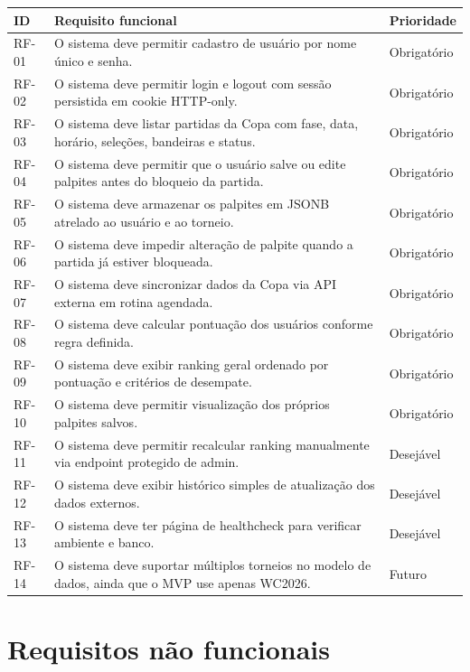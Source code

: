 \documentclass[12pt,a4paper]{article}
\begin{document}
\begin{longtable}{p{}p{}p{}}
\toprule
\textbf{ID} & \textbf{Requisito funcional} & \textbf{Prioridade} \\
\midrule
RF-01 & O sistema deve permitir cadastro de usuário por nome único e senha. & Obrigatório \\
RF-02 & O sistema deve permitir login e logout com sessão persistida em cookie HTTP-only. & Obrigatório \\
RF-03 & O sistema deve listar partidas da Copa com fase, data, horário, seleções, bandeiras e status. & Obrigatório \\
RF-04 & O sistema deve permitir que o usuário salve ou edite palpites antes do bloqueio da partida. & Obrigatório \\
RF-05 & O sistema deve armazenar os palpites em JSONB atrelado ao usuário e ao torneio. & Obrigatório \\
RF-06 & O sistema deve impedir alteração de palpite quando a partida já estiver bloqueada. & Obrigatório \\
RF-07 & O sistema deve sincronizar dados da Copa via API externa em rotina agendada. & Obrigatório \\
RF-08 & O sistema deve calcular pontuação dos usuários conforme regra definida. & Obrigatório \\
RF-09 & O sistema deve exibir ranking geral ordenado por pontuação e critérios de desempate. & Obrigatório \\
RF-10 & O sistema deve permitir visualização dos próprios palpites salvos. & Obrigatório \\
RF-11 & O sistema deve permitir recalcular ranking manualmente via endpoint protegido de admin. & Desejável \\
RF-12 & O sistema deve exibir histórico simples de atualização dos dados externos. & Desejável \\
RF-13 & O sistema deve ter página de healthcheck para verificar ambiente e banco. & Desejável \\
RF-14 & O sistema deve suportar múltiplos torneios no modelo de dados, ainda que o MVP use apenas WC2026. & Futuro \\
\bottomrule
\end{longtable}

\section{Requisitos não funcionais}
\end{document}
